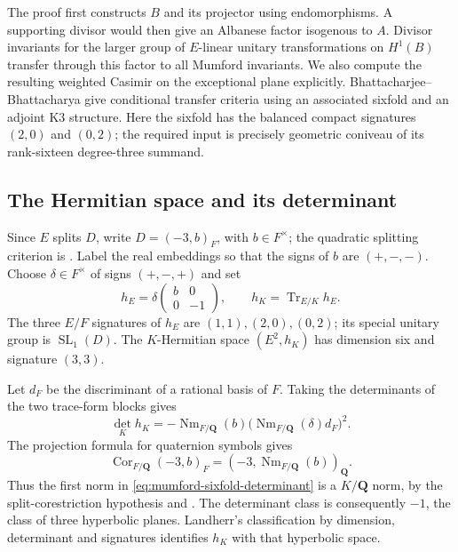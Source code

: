 \documentclass[11pt]{article}
\theoremstyle{definition}
\theoremstyle{remark}
\begin{document}
The proof first constructs $B$ and its projector using endomorphisms.
A supporting divisor would then give an Albanese factor isogenous to
$A$.  Divisor invariants for the larger group of $E$-linear unitary
transformations on $H^1(B)$ transfer through this factor to all
Mumford invariants.  We also compute the resulting weighted Casimir
on the exceptional plane explicitly.
Bhattacharjee--Bhattacharya \cite[Theorems~37--38]{BBK3Sixfolds}
give conditional transfer criteria using an associated sixfold and
an adjoint K3 structure.  Here the sixfold has the balanced compact
signatures $(2,0)$ and $(0,2)$; the required input is precisely
geometric coniveau of its rank-sixteen degree-three summand.

\subsection{The Hermitian space and its determinant}

Since $E$ splits $D$, write $D=(-3,b)_F$, with $b\in F^\times$;
the quadratic splitting criterion is
\cite[Lemma~5.4.7, pp.~73--74]{VoightQuaternion}.
Label the real embeddings so that the signs of $b$ are $(+,-,-)$.
Choose $\delta\in F^\times$ of signs $(+,-,+)$ and set
\[
 h_E=\delta\begin{pmatrix}b&0\\0&-1\end{pmatrix},
 \qquad h_K=\operatorname{Tr}_{E/K}h_E.
\]
The three $E/F$ signatures of $h_E$ are $(1,1),(2,0),(0,2)$;
its special unitary group is $\operatorname{SL}_1(D)$.
The $K$-Hermitian space $(E^2,h_K)$ has dimension six and signature
$(3,3)$.

Let $d_F$ be the discriminant of a rational basis of $F$.  Taking the
determinants of the two trace-form blocks gives
\begin{equation}
 \det_K h_K
 =-\operatorname{Nm}_{F/\mathbf Q}(b)
       \bigl(\operatorname{Nm}_{F/\mathbf Q}(\delta)d_F\bigr)^2.
 \label{eq:mumford-sixfold-determinant}
\end{equation}
The projection formula for quaternion symbols
\cite[II, Proposition~1.39(d), p.~74]{MilneCFT} gives
\[
 \operatorname{Cor}_{F/\mathbf Q}(-3,b)_F
   =(-3,\operatorname{Nm}_{F/\mathbf Q}(b))_{\mathbf Q}.
\]
Thus the first norm in \eqref{eq:mumford-sixfold-determinant} is a
$K/\mathbf Q$ norm, by the split-corestriction hypothesis and
\cite[Main Theorem~5.4.4(vi), pp.~72--73]{VoightQuaternion}.  The
determinant class is consequently $-1$, the class of three hyperbolic
planes.  Landherr's classification by dimension, determinant and
signatures \cite[pp.~246--247]{Landherr} identifies $h_K$ with that
hyperbolic space.
\end{document}
